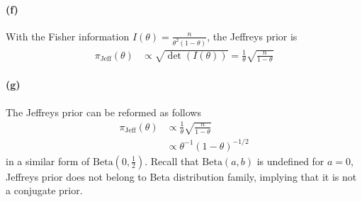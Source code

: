 \paragraph{(f)}
With the Fisher information $I(\theta) = \frac{n}{\theta^2(1-\theta)}$, the Jeffreys prior is 
\begin{align*}
    \pi_{\mathrm{Jeff}}(\theta)
    &\propto \sqrt{\det (I(\theta))} = \frac{1}{\theta} \sqrt{\frac{n}{1-\theta}}
\end{align*}

\paragraph{(g)}
The Jeffreys prior can be reformed as follows
\begin{align*}
    \pi_{\mathrm{Jeff}}(\theta)
    &\propto \frac{1}{\theta} \sqrt{\frac{n}{1-\theta}} \\
    &\propto \theta^{-1}(1-\theta)^{-1/2}
\end{align*}
in a similar form of $\mathrm{Beta}(0, \frac{1}{2})$. Recall that $\mathrm{Beta}(a, b)$ is undefined for $a=0$, Jeffreys prior does not belong to Beta distribution family, implying that it is not a conjugate prior. 
